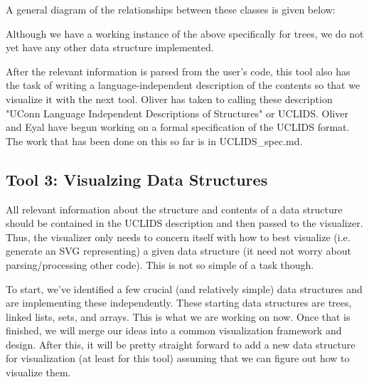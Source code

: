 \documentclass[12pt]{article}
\begin{document}
A general diagram of the relationships between these classes is given below:

\begin{center}
\end{center}

Although we have a working instance of the above specifically for trees, we do not yet have any other data structure implemented.

After the relevant information is parsed from the user's code, this tool also has the task of writing a language-independent description of the contents so that we visualize it with the next tool. Oliver has taken to calling these description "UConn Language Independent Descriptions of Structures" or UCLIDS. Oliver and Eyal have begun working on a formal specification of the UCLIDS format. The work that has been done on this so far is in UCLIDS\_spec.md.

\subsection*{Tool 3: Visualzing Data Structures}
All relevant information about the structure and contents of a data structure should be contained in the UCLIDS description and then passed to the visualizer. Thus, the visualizer only needs to concern itself with how to best visualize (i.e. generate an SVG representing) a given data structure (it need not worry about parsing/processing other code). This is not so simple of a task though.

To start, we've identified a few crucial (and relatively simple) data structures and are implementing these independently. These starting data structures are trees, linked lists, sets, and arrays. This is what we are working on now. Once that is finished, we will merge our ideas into a common visualization framework and design. After this, it will be pretty straight forward to add a new data structure for visualization (at least for this tool) assuming that we can figure out how to visualize them.
\end{document}
